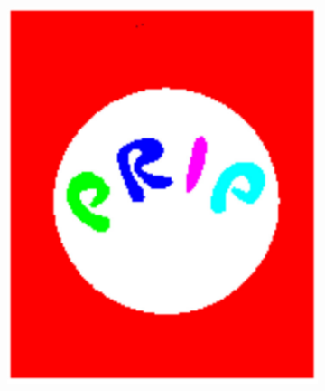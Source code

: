 \documentclass[12pt]{article}
\begin{document}
\begin{figure}[tb]
  \centering

  \begin{subfigure}[b]{0.25\textwidth}
        \includegraphics[width=\textwidth]{img/prip1}
        \caption{}\label{fig:prip1}
    \end{subfigure}
    ~
    \begin{subfigure}[b]{0.25\textwidth}

\end{subfigure}
\end{figure}
\end{document}
